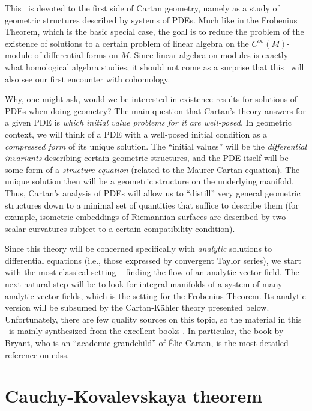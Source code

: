 This \chap\ is devoted to the first side of Cartan geometry, namely as a study of geometric structures described by systems of PDEs.
Much like in the Frobenius Theorem, which is the basic special case, the goal is to reduce the problem of the existence of solutions to a certain problem of linear algebra on the $C^\infty(M)$-module of differential forms on $M$. Since linear algebra on modules is exactly what homological algebra studies, it should not come as a surprise that this \chap\ will also see our first encounter with cohomology.

Why, one might ask, would we be interested in existence results for solutions of PDEs when doing geometry? The main question that Cartan's theory answers for a given PDE is \emph{which initial value problems for it are well-posed}. In geometric context, we will think of a PDE with a well-posed initial condition as a \emph{compressed form} of its unique solution. The ``initial values'' will be the \emph{differential invariants} describing certain geometric structures, and the PDE itself will be some form of a \emph{structure equation} (related to the Maurer-Cartan equation). The unique solution then will be a geometric structure on the underlying manifold. Thus, Cartan's analysis of PDEs will allow us to ``distill'' very general geometric structures down to a minimal set of quantities that suffice to describe them (for example, isometric embeddings of Riemannian surfaces are described by two scalar curvatures subject to a certain compatibility condition).

Since this theory will be concerned specifically with \emph{analytic} solutions to differential equations (i.e., those expressed by convergent Taylor series), we start with the most classical setting -- finding the flow of an analytic vector field. The next natural step will be to look for integral manifolds of a system of many analytic vector fields, which is the setting for the Frobenius Theorem. Its analytic version will be subsumed by the Cartan-K\"ahler theory presented below. Unfortunately, there are few quality sources on this topic, so the material in this \chap\ is mainly synthesized from the excellent books \cite{Bryant,Ivey,McKayEDS}. In particular, the book by Bryant, who is an ``academic grandchild'' of \'Elie Cartan, is the most detailed reference on \glspl{eds}.




\section{Cauchy-Kovalevskaya theorem}


